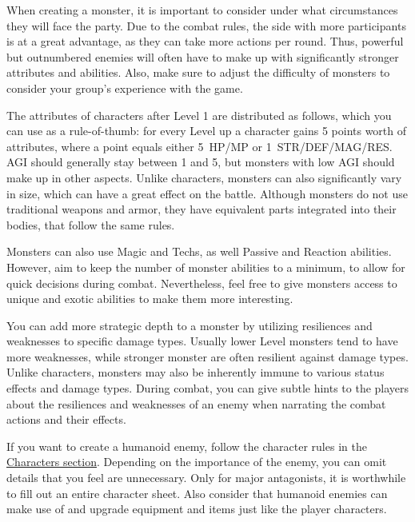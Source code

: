 \begin{description}[leftmargin=*]

\item[\color{accent} Context:]
When creating a monster, it is important to consider under what circumstances they will face the party.
Due to the combat rules, the side with more participants is at a great advantage, as they can take more actions per round.
Thus, powerful but outnumbered enemies will often have to make up with significantly stronger attributes and abilities.
Also, make sure to adjust the difficulty of monsters to consider your group's experience with the game.

\item[\color{accent} Attributes:]
The attributes of characters after Level 1 are distributed as follows, which you can use as a rule-of-thumb:
for every Level up a character gains 5 points worth of attributes, where a point equals either 5~HP/MP or 1~STR/DEF/MAG/RES.
\pagebreak
AGI should generally stay between 1 and 5, but monsters with low AGI should make up in other aspects.  
Unlike characters, monsters can also significantly vary in size, which can have a great effect on the battle.
Although monsters do not use traditional weapons and armor, they have equivalent parts integrated into their bodies, that follow the same rules.

\item[\color{accent} Abilities:]
Monsters can also use Magic and Techs, as well Passive and Reaction abilities.
However, aim to keep the number of monster abilities to a minimum, to allow for quick decisions during combat.
Nevertheless, feel free to give monsters access to unique and exotic abilities to make them more interesting. 

\item[\color{accent} Resiliences \& Weaknesses:]
You can add more strategic depth to a monster by utilizing resiliences and weaknesses to specific damage types.
Usually lower Level monsters tend to have more weaknesses, while stronger monster are often resilient against damage types.
Unlike characters, monsters may also be inherently immune to various status effects and damage types.
During combat, you can give subtle hints to the players about the resiliences and weaknesses of an enemy when narrating the combat actions and their effects.

\item[\color{accent} Humanoids:]
If you want to create a humanoid enemy, follow the character rules in the \hyperlink{char}{Characters section}.
Depending on the importance of the enemy, you can omit details that you feel are unnecessary.	
Only for major antagonists, it is worthwhile to fill out an entire character sheet.
Also consider that humanoid enemies can make use of and upgrade equipment and items just like the player characters.	
	
\end{description}

